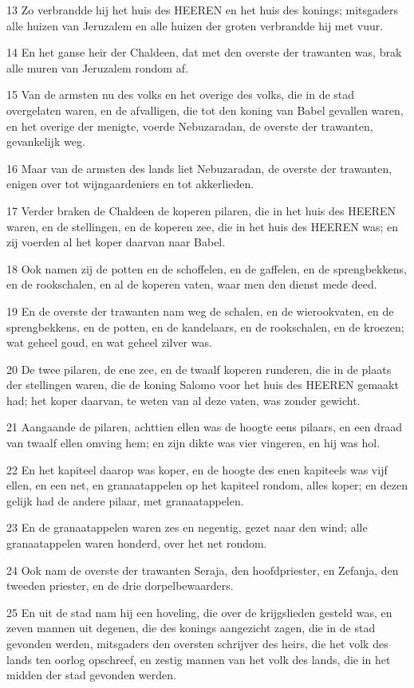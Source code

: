 \par 13 Zo verbrandde hij het huis des HEEREN en het huis des konings; mitsgaders alle huizen van Jeruzalem en alle huizen der groten verbrandde hij met vuur.
\par 14 En het ganse heir der Chaldeen, dat met den overste der trawanten was, brak alle muren van Jeruzalem rondom af.
\par 15 Van de armsten nu des volks en het overige des volks, die in de stad overgelaten waren, en de afvalligen, die tot den koning van Babel gevallen waren, en het overige der menigte, voerde Nebuzaradan, de overste der trawanten, gevankelijk weg.
\par 16 Maar van de armsten des lands liet Nebuzaradan, de overste der trawanten, enigen over tot wijngaardeniers en tot akkerlieden.
\par 17 Verder braken de Chaldeen de koperen pilaren, die in het huis des HEEREN waren, en de stellingen, en de koperen zee, die in het huis des HEEREN was; en zij voerden al het koper daarvan naar Babel.
\par 18 Ook namen zij de potten en de schoffelen, en de gaffelen, en de sprengbekkens, en de rookschalen, en al de koperen vaten, waar men den dienst mede deed.
\par 19 En de overste der trawanten nam weg de schalen, en de wierookvaten, en de sprengbekkens, en de potten, en de kandelaars, en de rookschalen, en de kroezen; wat geheel goud, en wat geheel zilver was.
\par 20 De twee pilaren, de ene zee, en de twaalf koperen runderen, die in de plaats der stellingen waren, die de koning Salomo voor het huis des HEEREN gemaakt had; het koper daarvan, te weten van al deze vaten, was zonder gewicht.
\par 21 Aangaande de pilaren, achttien ellen was de hoogte eens pilaars, en een draad van twaalf ellen omving hem; en zijn dikte was vier vingeren, en hij was hol.
\par 22 En het kapiteel daarop was koper, en de hoogte des enen kapiteels was vijf ellen, en een net, en granaatappelen op het kapiteel rondom, alles koper; en dezen gelijk had de andere pilaar, met granaatappelen.
\par 23 En de granaatappelen waren zes en negentig, gezet naar den wind; alle granaatappelen waren honderd, over het net rondom.
\par 24 Ook nam de overste der trawanten Seraja, den hoofdpriester, en Zefanja, den tweeden priester, en de drie dorpelbewaarders.
\par 25 En uit de stad nam hij een hoveling, die over de krijgslieden gesteld was, en zeven mannen uit degenen, die des konings aangezicht zagen, die in de stad gevonden werden, mitsgaders den oversten schrijver des heirs, die het volk des lands ten oorlog opschreef, en zestig mannen van het volk des lands, die in het midden der stad gevonden werden.
